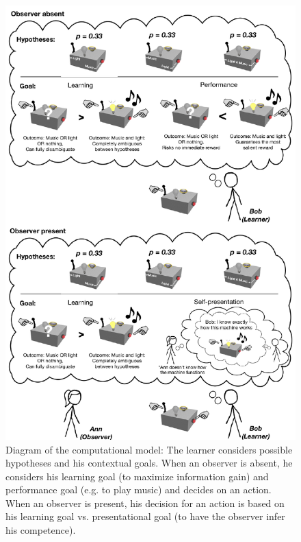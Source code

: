 \documentclass[10pt, letterpaper]{article}
\newenvironment{CodeChunk}{}{}
\begin{document}
\begin{CodeChunk}
\captionsetup{width=0.8\textwidth}\begin{figure}[h]

{\centering \includegraphics{figs/model_diagram-1} 

}

\caption[Diagram of the computational model]{Diagram of the computational model: The learner considers possible hypotheses and his contextual goals. When an observer is absent, he considers his learning goal (to maximize information gain) and performance goal (e.g. to play music) and decides on an action. When an observer is present, his decision for an action is based on his learning goal vs. presentational goal (to have the observer infer his competence).}\label{fig:model_diagram}
\end{figure}
\end{CodeChunk}
\end{document}
